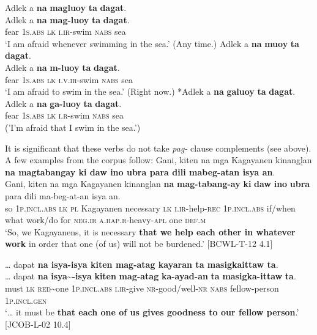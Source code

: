 \newpage
\ea
\label{bkm:Ref474418733}
    \ea
    \label{bkm:Ref474418733a}
    Adlek  a  \textbf{na}  \textbf{magluoy}  \textbf{ta}  \textbf{dagat}. \\\smallskip
\gll Adlek  a  \textbf{na}  \textbf{mag-luoy}  \textbf{ta}  \textbf{dagat}. \\
    fear  1\textsc{s.abs}  \textsc{lk}  \textsc{i.ir}-swim  \textsc{nabs}  sea \\
    \glt ‘I am afraid whenever swimming in the sea.’ (Any time.)
    \ex
    \label{bkm:Ref474418733b}
    Adlek  a  \textbf{na}  \textbf{muoy}  \textbf{ta}  \textbf{dagat}. \\\smallskip
\gll Adlek  a  \textbf{na}  \textbf{m-luoy}  \textbf{ta}  \textbf{dagat}. \\
    fear  1\textsc{s.abs}  \textsc{lk}  \textsc{i.v.ir}-swim  \textsc{nabs}  sea \\
    \glt ‘I am afraid to swim in the sea.’ (Right now.)
    \ex
    \label{bkm:Ref474418733c}
    *Adlek  a  \textbf{na}  \textbf{galuoy}  \textbf{ta}  \textbf{dagat}. \\\smallskip
\gll *Adlek  a  \textbf{na}  \textbf{ga-luoy}  \textbf{ta}  \textbf{dagat}. \\
    fear  1\textsc{s.abs  lk}  \textsc{i.r}-swim  \textsc{nabs}  sea \\
    \glt ('I'm afraid that I swim in the sea.')
    \z
\z

It is significant that these verbs do not take \textit{pag-} clause complements (see  above). A few examples from the corpus follow:
\ea
Gani,  kiten  na  mga  Kagayanen  kinangļan  \textbf{na  magtabangay  ki daw  ino  ubra  para  dili  mabeg-atan  isya  an}. \smallskip\\
\gll Gani,  kiten  na  mga  Kagayanen  kinangļan  \textbf{na}  \textbf{mag-tabang-ay}  \textbf{ki} \textbf{daw}  \textbf{ino}  \textbf{ubra}  para  dili  ma-beg-at-an  isya  an. \\
so  1\textsc{p.incl.abs}  \textsc{lk}  \textsc{pl}  Kagayanen  necessary  \textsc{lk}  \textsc{i.ir}-help-\textsc{rec}  1\textsc{p.incl.abs}
if/when  what  work/do  for  \textsc{neg.ir}  \textsc{a.hap.r}-heavy-\textsc{apl}  one  \textsc{def.m} \\
\glt `So, we Kagayanens, it is necessary \textbf{that we help each other in whatever work} in order that one (of us) will not be burdened.’ [BCWL-T-12 4.1]
\z

\ea
… dapat  \textbf{na  isya-isya  kiten  mag-atag  kayaran  ta masigkaittaw  ta}. \smallskip\\
\gll … dapat  \textbf{na}  \textbf{isya\sim{}-isya}  \textbf{kiten}  \textbf{mag-atag}  \textbf{ka-ayad-an}  \textbf{ta} \textbf{masigka-ittaw}  \textbf{ta}. \\
{}    must  \textsc{lk}  \textsc{red}\sim{}one  1\textsc{p.incl.abs}  \textsc{i.ir}-give  \textsc{nr}-good/well-\textsc{nr}  \textsc{nabs}
fellow-person  1\textsc{p.incl.gen} \\
\glt `… it must be \textbf{that each one of us gives goodness to our fellow person}.’ [JCOB-L-02 10.4]
\z

